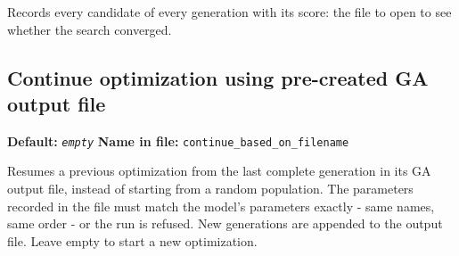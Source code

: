 \documentclass[11pt]{article}
\begin{document}
Records every candidate of every generation with its score: the file to open to see whether the search converged.
\subsection{Continue optimization using pre-created GA output file}
{\small \textbf{Default:} \texttt{\textit{empty}} \quad\textbullet\quad \textbf{Name in file:} \texttt{continue\_\allowbreak{}based\_\allowbreak{}on\_\allowbreak{}filename}}

Resumes a previous optimization from the last complete generation in its GA output file, instead of starting from a random population. The parameters recorded in the file must match the model's parameters exactly - same names, same order - or the run is refused. New generations are appended to the output file. Leave empty to start a new optimization.
\end{document}
